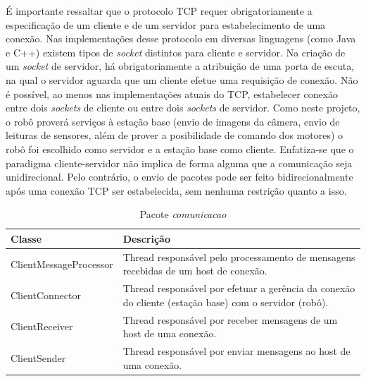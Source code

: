 É importante ressaltar que o protocolo TCP requer obrigatoriamente a especificação de um cliente e de um servidor para estabelecimento de uma conexão. Nas implementações desse protocolo em diversas linguagens (como Java e C++) existem tipos de \textit{socket} distintos para cliente e servidor. Na criação de um \textit{socket} de servidor, há obrigatoriamente a atribuição de uma porta de escuta, na qual o servidor aguarda que um cliente efetue uma requisição de conexão. Não é possível, ao menos nas implementações atuais do TCP, estabelecer conexão entre dois \textit{sockets} de cliente ou entre dois \textit{sockets} de servidor. Como neste projeto, o robô proverá serviços à estação base (envio de imagens da câmera, envio de leituras de sensores, além de prover a posibilidade de comando dos motores) o robô foi escolhido como servidor e a estação base como cliente. Enfatiza-se que o paradigma cliente-servidor não implica de forma alguma que a comunicação seja unidirecional. Pelo contrário, o envio de pacotes 
pode ser feito bidirecionalmente após uma conexão TCP ser estabelecida, sem nenhuma restrição quanto a isso.

\begin{table}[h]
  \centering
  \caption{Pacote \textit{comunicacao}}
  \begin{tabular}{p{6cm}p{8cm}}
    \toprule
    \textbf{Classe} & \textbf{Descrição} \\ 
    \midrule
    ClientMessageProcessor & Thread responsável pelo processamento de mensagens recebidas de um host de conexão. \\ \hline
    ClientConnector & Thread responsável por efetuar a gerência da conexão do cliente (estação base) com o servidor (robô). \\ \hline
    ClientReceiver & Thread responsável por receber mensagens de um host de uma conexão. \\ \hline
    ClientSender & Thread responsável por enviar mensagens ao host de uma conexão. \\ \hline
    \bottomrule
  \end{tabular}%
  \label{tab:pacote_comunicacao}%
\end{table}%

